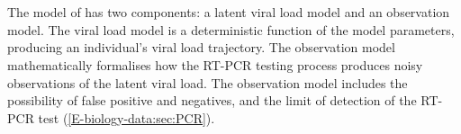 \documentclass[thesis.tex]{subfiles}
\begin{document}

\section{\texorpdfstring{\textcite{hakkiOnset}}{Hakki et al. (2022)}} \label{ATACCC:sec:hakki}

The model of \textcite{hakkiOnset} has two components: a latent viral load model and an observation model.
The viral load model is a deterministic function of the model parameters, producing an individual's viral load trajectory.
The observation model mathematically formalises how the RT-PCR testing process produces noisy observations of the latent viral load.
The observation model includes the possibility of false positive and negatives, and the limit of detection of the RT-PCR test (\cref{E-biology-data:sec:PCR}).
\end{document}
